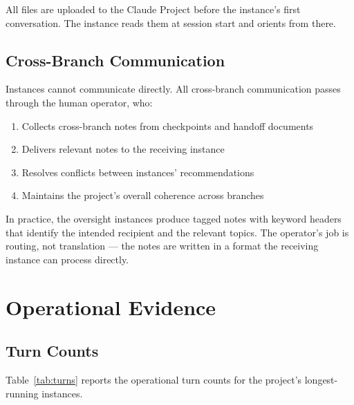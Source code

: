 \documentclass[11pt,a4paper]{article}
\begin{document}
All files are uploaded to the Claude Project before the instance's first conversation. The instance reads them at session start and orients from there.

\subsection{Cross-Branch Communication}

Instances cannot communicate directly. All cross-branch communication passes through the human operator, who:

\begin{enumerate}[leftmargin=2em]
    \item Collects cross-branch notes from checkpoints and handoff documents
    \item Delivers relevant notes to the receiving instance
    \item Resolves conflicts between instances' recommendations
    \item Maintains the project's overall coherence across branches
\end{enumerate}

In practice, the oversight instances produce tagged notes with keyword headers that identify the intended recipient and the relevant topics. The operator's job is routing, not translation --- the notes are written in a format the receiving instance can process directly.


\section{Operational Evidence}

\subsection{Turn Counts}

Table~\ref{tab:turns} reports the operational turn counts for the project's longest-running instances.
\end{document}
